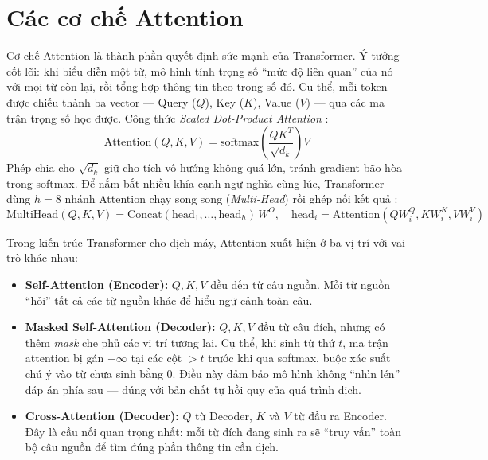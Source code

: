 \documentclass[a4paper,12pt,twoside]{report}
\begin{document}
\section{Các cơ chế Attention}
Cơ chế Attention là thành phần quyết định sức mạnh của Transformer. Ý tưởng cốt lõi: khi biểu diễn một từ, mô hình tính trọng số ``mức độ liên quan'' của nó với mọi từ còn lại, rồi tổng hợp thông tin theo trọng số đó. Cụ thể, mỗi token được chiếu thành ba vector --- Query ($Q$), Key ($K$), Value ($V$) --- qua các ma trận trọng số học được. Công thức \textit{Scaled Dot-Product Attention} \cite{vaswani2017attention}:
\begin{equation}
    \text{Attention}(Q, K, V) = \text{softmax}\!\left(\frac{QK^T}{\sqrt{d_k}}\right) V
    \label{eq:attention}
\end{equation}
Phép chia cho $\sqrt{d_k}$ giữ cho tích vô hướng không quá lớn, tránh gradient bão hòa trong softmax. Để nắm bắt nhiều khía cạnh ngữ nghĩa cùng lúc, Transformer dùng $h = 8$ nhánh Attention chạy song song (\textit{Multi-Head}) rồi ghép nối kết quả \cite{vaswani2017attention}:
\begin{equation}
    \text{MultiHead}(Q,K,V) = \text{Concat}(\text{head}_1, \ldots, \text{head}_h)\, W^O, \quad
    \text{head}_i = \text{Attention}(QW_i^Q, KW_i^K, VW_i^V)
\end{equation}

Trong kiến trúc Transformer cho dịch máy, Attention xuất hiện ở ba vị trí với vai trò khác nhau:
\begin{itemize}
    \item \textbf{Self-Attention (Encoder):} $Q, K, V$ đều đến từ câu nguồn. Mỗi từ nguồn ``hỏi'' tất cả các từ nguồn khác để hiểu ngữ cảnh toàn câu.
    \item \textbf{Masked Self-Attention (Decoder):} $Q, K, V$ đều từ câu đích, nhưng có thêm \textit{mask} che phủ các vị trí tương lai. Cụ thể, khi sinh từ thứ $t$, ma trận attention bị gán $-\infty$ tại các cột $> t$ trước khi qua softmax, buộc xác suất chú ý vào từ chưa sinh bằng 0. Điều này đảm bảo mô hình không ``nhìn lén'' đáp án phía sau --- đúng với bản chất tự hồi quy của quá trình dịch.
    \item \textbf{Cross-Attention (Decoder):} $Q$ từ Decoder, $K$ và $V$ từ đầu ra Encoder. Đây là cầu nối quan trọng nhất: mỗi từ đích đang sinh ra sẽ ``truy vấn'' toàn bộ câu nguồn để tìm đúng phần thông tin cần dịch.
\end{itemize}
\end{document}
